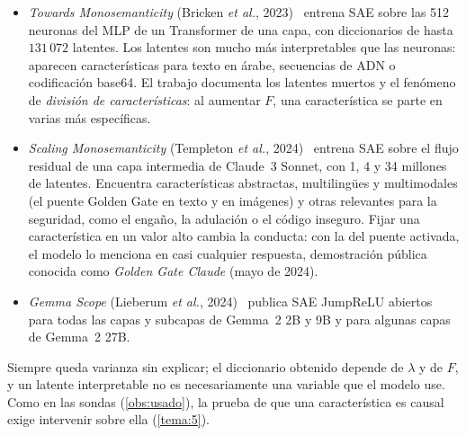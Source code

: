 \begin{itemize}[leftmargin=1.4em]
  \item \emph{Towards Monosemanticity} (Bricken \emph{et al.}, 2023)~\cite{bricken} entrena SAE sobre las 512 neuronas del MLP de un Transformer de una capa, con diccionarios de hasta $131\,072$ latentes. Los latentes son mucho más interpretables que las neuronas: aparecen características para texto en árabe, secuencias de ADN o codificación base64. El trabajo documenta los latentes muertos y el fenómeno de \emph{división de características}: al aumentar $F$, una característica se parte en varias más específicas.
  \item \emph{Scaling Monosemanticity} (Templeton \emph{et al.}, 2024)~\cite{templeton} entrena SAE sobre el flujo residual de una capa intermedia de Claude~3 Sonnet, con 1, 4 y 34 millones de latentes. Encuentra características abstractas, multilingües y multimodales (el puente Golden Gate en texto y en imágenes) y otras relevantes para la seguridad, como el engaño, la adulación o el código inseguro. Fijar una característica en un valor alto cambia la conducta: con la del puente activada, el modelo lo menciona en casi cualquier respuesta, demostración pública conocida como \emph{Golden Gate Claude} (mayo de 2024).
  \item \emph{Gemma Scope} (Lieberum \emph{et al.}, 2024)~\cite{gemmascope} publica SAE JumpReLU abiertos para todas las capas y subcapas de Gemma~2 2B y 9B y para algunas capas de Gemma~2 27B.
\end{itemize}

\begin{observacion}[Límites]\label{obs:limites-sae}
Siempre queda varianza sin explicar; el diccionario obtenido depende de $\lambda$ y de $F$, y un latente interpretable no es necesariamente una variable que el modelo use. Como en las sondas (\cref{obs:usado}), la prueba de que una característica es causal exige intervenir sobre ella (\cref{tema:5}).
\end{observacion}

